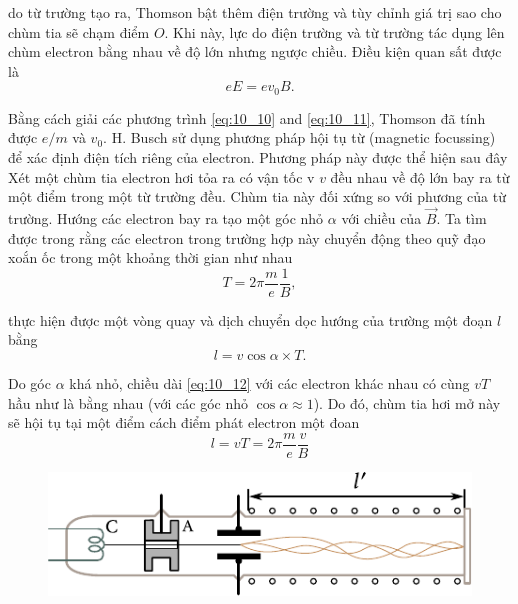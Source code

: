 \noindent
do từ trường tạo ra, Thomson bật thêm điện trường và tùy chỉnh giá trị sao cho chùm tia sẽ chạm điểm $O$.
Khi này, lực do điện trường và từ trường tác dụng lên chùm electron bằng nhau về độ lớn nhưng ngược chiều.
Điều kiện quan sất được là
\begin{equation}\label{eq:10_11}
    eE = ev_0 B.
\end{equation}

\noindent
Bằng cách giải các phương trình \eqref{eq:10_10} and \eqref{eq:10_11}, Thomson
đã tính được $e/m$ và $v_0$.
H. Busch sử dụng phương pháp hội tụ từ (magnetic focussing) để xác định điện tích riêng của electron.
Phương pháp này được thể hiện sau đây
Xét một chùm tia electron hơi tỏa ra có vận tốc v $v$ đều nhau về độ lớn bay ra từ một điểm trong một từ trường đều.
Chùm tia này đối xứng so với phương của từ trường.
Hướng các electron bay ra tạo một góc nhỏ $\alpha$ với chiều của $\vec{B}$.
Ta tìm được trong  rằng các electron trong trường hợp này chuyển động theo quỹ đạo xoắn ốc trong một khoảng thời gian như nhau
\begin{equation*}
    T = 2\pi \frac{m}{e} \frac{1}{B},
\end{equation*}

\noindent
thực hiện được một vòng quay và dịch chuyển dọc hướng của trường một đoạn $l$ bằng
\begin{equation}\label{eq:10_12}
    l = v\cos\alpha \times T.
\end{equation}

\noindent
Do góc $\alpha$ khá nhỏ, chiều dài \eqref{eq:10_12} với các electron khác nhau có cùng $vT$ hầu như là bằng nhau (với các góc nhỏ $\cos\alpha\approx 1$).
Do đó, chùm tia hơi mở này sẽ hội tụ tại một điểm cách điểm phát electron một đoan
\begin{equation}\label{eq:10_13}
    l = vT = 2 \pi \frac{m}{e} \frac{v}{B}
\end{equation}

\noindent

\begin{figure}[t]
	\begin{center}
		\includegraphics[scale=1]{figures/ch_10/fig_10_7.pdf}
		\caption[]{}
		\label{fig:10_7}
	\end{center}
	\vspace{-0.8cm}
\end{figure}

